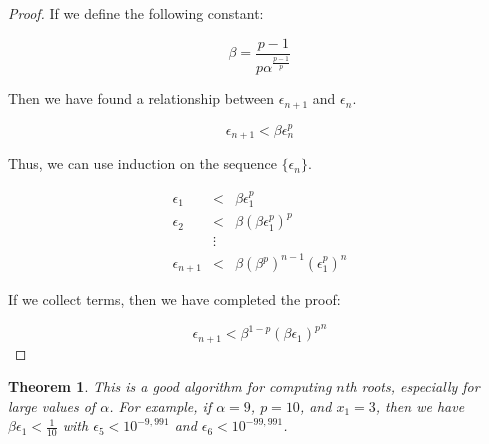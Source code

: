 \documentclass[psamsfonts]{amsart}
\newtheorem{thm}{Theorem}[section]
\theoremstyle{definition}
\theoremstyle{remark}
\numberwithin{equation}{section}
\begin{document}
\begin{proof}
If we define the following constant:

\begin{equation}
\beta = \frac{p-1}{p \alpha^{\frac{p-1}{p}}}
\end{equation}

Then we have found a relationship between $\epsilon_{n+1}$ and $\epsilon_n$.

\begin{equation}
\epsilon_{n+1} < \beta \epsilon_n^p
\end{equation}

Thus, we can use induction on the sequence $\{ \epsilon_n \}$.

\begin{eqnarray}
\epsilon_1 &<& \beta \epsilon_1^p \\
\epsilon_2 &<& \beta ( \beta \epsilon_1^p )^p \\
&\vdots& \\
\epsilon_{n+1} &<& \beta (\beta^p)^{n-1} (\epsilon_1^p)^n
\end{eqnarray}

If we collect terms, then we have completed the proof:

\begin{equation}
\epsilon_{n+1} < \beta^{1-p} {(\beta \epsilon_1)^p}^n
\end{equation}
\end{proof}

\begin{thm}
This is a good algorithm for computing $n$th roots, especially for large values of $\alpha$. For example, if $\alpha = 9$, $p = 10$, and $x_1 = 3$, then we have $\beta \epsilon_1 < \frac{1}{10}$ with $\epsilon_5 < 10^{-9,991}$ and $\epsilon_6 < 10^{-99,991}$.
\end{thm}
\end{document}
